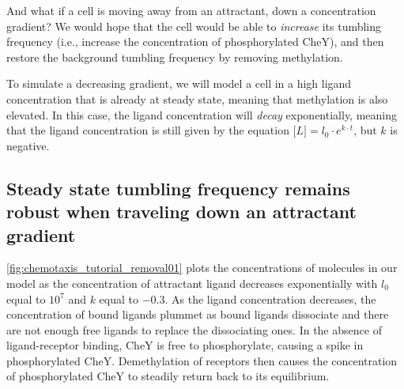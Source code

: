 And what if a cell is moving away from an attractant, down a concentration gradient? We would hope that the cell would be able to \textit{increase} its tumbling frequency (i.e., increase the concentration of phosphorylated CheY), and then restore the background tumbling frequency by removing methylation.

To simulate a decreasing gradient, we will model a cell in a high ligand concentration that is already at steady state, meaning that methylation is also elevated. In this case, the ligand concentration will \textit{decay} exponentially, meaning that the ligand concentration is still given by the equation $\text{[}L{]} = l_0 \cdot e^{k \cdot t}$, but $k$ is negative.\\

\begin{qbox}\end{qbox}


\FloatBarrier
{}
\subsection{Steady state tumbling frequency remains robust when traveling down an attractant gradient}

\autoref{fig:chemotaxis_tutorial_removal01} plots the concentrations of molecules in our model as the concentration of attractant ligand decreases exponentially with $l_0$ equal to $10^7$ and $k$ equal to $-0.3$. As the ligand concentration decreases, the concentration of bound ligands plummet as bound ligands dissociate and there are not enough free ligands to replace the dissociating ones. In the absence of ligand-receptor binding, CheY is free to phosphorylate, causing a spike in phosphorylated CheY. Demethylation of receptors then causes the concentration of phosphorylated CheY to steadily return back to its equilibrium.\\

